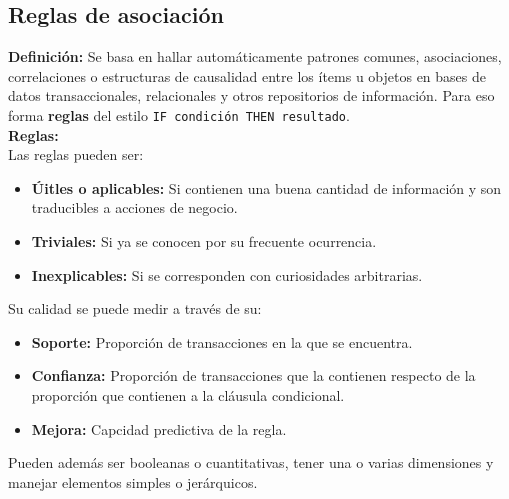 \subsection*{Reglas de asociación}
\textbf{Definición:} Se basa en hallar automáticamente patrones comunes, asociaciones, correlaciones o estructuras de causalidad entre los ítems u objetos en bases de datos transaccionales, relacionales y otros repositorios de información. Para eso forma \textbf{reglas} del estilo \texttt{IF condición THEN resultado}. \\
\textbf{Reglas:} \\
Las reglas pueden ser:
\begin{itemize}
    \item \textbf{Úitles o aplicables:} Si contienen una buena cantidad de información y son traducibles a acciones de negocio.
    \item \textbf{Triviales:} Si ya se conocen por su frecuente ocurrencia.
    \item \textbf{Inexplicables:} Si se corresponden con curiosidades arbitrarias.
\end{itemize}
Su calidad se puede medir a través de su:
\begin{itemize}
    \item \textbf{Soporte:} Proporción de transacciones en la que se encuentra.
    \item \textbf{Confianza:} Proporción de transacciones que la contienen respecto de la proporción que contienen a la cláusula condicional.
    \item \textbf{Mejora:} Capcidad predictiva de la regla.
\end{itemize}
Pueden además ser booleanas o cuantitativas, tener una o varias dimensiones y manejar elementos simples o jerárquicos.
